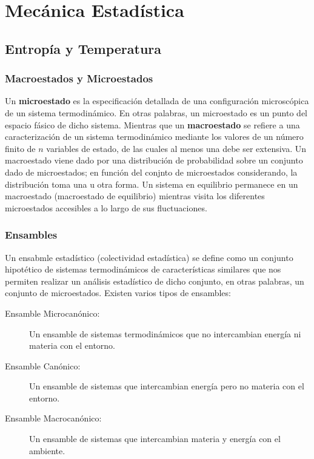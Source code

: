 \part{Mecánica Estadística}

\chapter{Entropía y Temperatura}

\section{Macroestados y Microestados}

Un \textbf{microestado} es la especificación detallada de una configuración microscópica de un sistema termodinámico. En otras palabras, un microestado es un punto del espacio fásico de dicho sistema. Mientras que un \textbf{macroestado} se refiere a una caracterización de un sistema termodinámico mediante los valores de un número finito de $n$ variables de estado, de las cuales al menos una debe ser extensiva. Un macroestado viene dado por una distribución de probabilidad sobre un conjunto dado de microestados; en función del conjnto de microestados considerando, la distribución toma una u otra forma. Un sistema en equilibrio permanece en un macroestado (macroestado de equilibrio) mientras visita los diferentes microestados accesibles a lo largo de sus fluctuaciones.


\section{Ensambles}

Un ensabmle estadístico (colectividad estadística) se define como un conjunto hipotético de sistemas termodinámicos de características similares que nos permiten realizar un análisis estadístico de dicho conjunto, en otras palabras, un conjunto de microestados. Existen varios tipos de ensambles:
\begin{description}
    \item[Ensamble Microcanónico: ] Un ensamble de sistemas termodinámicos que no intercambian energía ni materia con el entorno.
    \item[Ensamble Canónico: ] Un ensamble de sistemas que intercambian energía pero no materia con el entorno.
    \item[Ensamble Macrocanónico: ] Un ensamble de sistemas que intercambian materia y energía con el ambiente.
\end{description}

